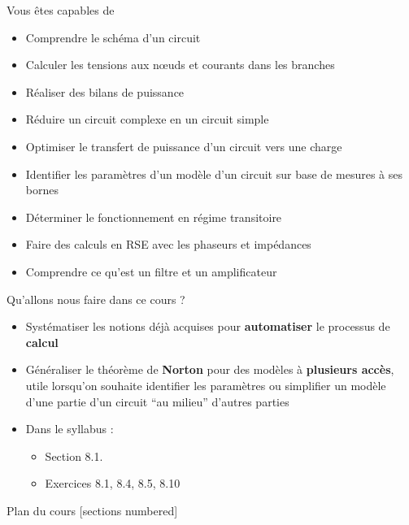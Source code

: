 \begin{frame}{Vous êtes capables de}
\begin{itemize}
    \item Comprendre le schéma d’un circuit
    \item Calculer les tensions aux n{\oe}uds et courants dans les branches
    \item Réaliser des bilans de puissance
    \item Réduire un circuit complexe en un circuit simple
    \item Optimiser le transfert de puissance d’un circuit vers une charge
    \item Identifier les paramètres d’un modèle d’un circuit sur base de mesures à ses bornes
    \item Déterminer le fonctionnement en régime transitoire
    \item Faire des calculs en RSE avec les phaseurs et impédances
    \item Comprendre ce qu’est un filtre et un amplificateur
\end{itemize}
\end{frame}

\begin{frame}{Qu’allons nous faire dans ce cours ?}
    \begin{itemize}
        \item Systématiser les notions déjà acquises pour \textbf{automatiser} le processus de \textbf{calcul} 
        \item Généraliser le théorème de \textbf{Norton} pour des modèles à\textbf{ plusieurs accès}, utile lorsqu’on souhaite identifier les paramètres ou simplifier un modèle d’une partie d’un circuit “au milieu” d’autres parties
        \item Dans le syllabus : 
        \begin{itemize}
            \item Section 8.1.
            \item Exercices 8.1, 8.4, 8.5, 8.10
        \end{itemize} 
    \end{itemize}
    

\end{frame}

\begin{frame}{Plan du cours}
    [sections numbered]
    \tableofcontents[hideallsubsections]
\end{frame}


